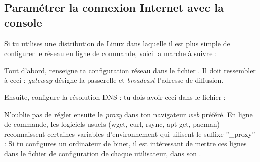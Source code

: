 \subsection{Param\'etrer la connexion Internet avec la console}
\label{linux_cmdline}
Si tu utilises une distribution de Linux dans laquelle il est plus simple de configurer le r\'eseau en ligne de commande, voici la marche \`a suivre :

Tout d'abord, renseigne ta configuration r\'eseau dans le fichier . Il doit ressembler \`a ceci :
\noindent {}
\emph{gateway} d\'esigne la passerelle et \emph{broadcast} l'adresse de diffusion.
\newline

Ensuite, configure la r\'esolution DNS : tu dois avoir ceci dans le fichier  :
\noindent {}

N'oublie pas de r\'egler ensuite le \emph{proxy} dans ton navigateur \emph{web} pr\'ef\'er\'e.
En ligne de commande, les logiciels usuels (wget, curl, rsync, apt-get, pacman) reconnaissent certaines variables d'environnement qui uilisent le suffixe ''\_proxy'' :
\noindent {}
Si tu configures un ordinateur de binet, il est intéressant de mettre ces lignes dans le fichier de configuration de chaque utilisateur, dans son .
